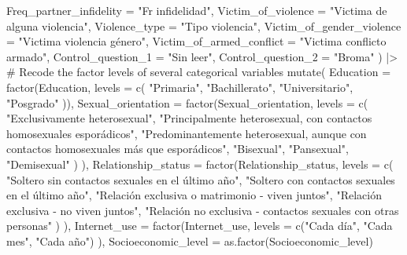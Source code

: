 \documentclass[
  bookmarksnumbered]{article}
\newenvironment{Shaded}{\begin{snugshade}}{\end{snugshade}}
\newcommand{\AttributeTok}[1]{\textcolor[rgb]{0.80,0.80,0.80}{#1}}
\newcommand{\CommentTok}[1]{\textcolor[rgb]{0.50,0.62,0.50}{#1}}
\newcommand{\FunctionTok}[1]{\textcolor[rgb]{0.94,0.94,0.56}{#1}}
\newcommand{\NormalTok}[1]{\textcolor[rgb]{0.80,0.80,0.80}{#1}}
\newcommand{\SpecialCharTok}[1]{\textcolor[rgb]{0.86,0.64,0.64}{#1}}
\newcommand{\StringTok}[1]{\textcolor[rgb]{0.80,0.58,0.58}{#1}}
\begin{document}
\begin{Shaded}
\begin{Highlighting}[]
    \AttributeTok{Freq\_partner\_infidelity =} \StringTok{"Fr infidelidad"}\NormalTok{,}
    \AttributeTok{Victim\_of\_violence =} \StringTok{"Victima de alguna violencia"}\NormalTok{,}
    \AttributeTok{Violence\_type =} \StringTok{"Tipo violencia"}\NormalTok{,}
    \AttributeTok{Victim\_of\_gender\_violence =} \StringTok{"Victima violencia género"}\NormalTok{,}
    \AttributeTok{Victim\_of\_armed\_conflict =} \StringTok{"Victima conflicto armado"}\NormalTok{,}
    \AttributeTok{Control\_question\_1 =} \StringTok{"Sin leer"}\NormalTok{,}
    \AttributeTok{Control\_question\_2 =} \StringTok{"Broma"}
\NormalTok{  ) }\SpecialCharTok{|\textgreater{}}
  \CommentTok{\# Recode the factor levels of several categorical variables}
  \FunctionTok{mutate}\NormalTok{(}
    \AttributeTok{Education =} \FunctionTok{factor}\NormalTok{(Education, }\AttributeTok{levels =} \FunctionTok{c}\NormalTok{(}
      \StringTok{"Primaria"}\NormalTok{,}
      \StringTok{"Bachillerato"}\NormalTok{,}
      \StringTok{"Universitario"}\NormalTok{,}
      \StringTok{"Posgrado"}
\NormalTok{    )),}
    \AttributeTok{Sexual\_orientation =} \FunctionTok{factor}\NormalTok{(Sexual\_orientation,}
      \AttributeTok{levels =} \FunctionTok{c}\NormalTok{(}
        \StringTok{"Exclusivamente heterosexual"}\NormalTok{,}
        \StringTok{"Principalmente heterosexual, con contactos homosexuales esporádicos"}\NormalTok{,}
        \StringTok{"Predominantemente heterosexual, aunque con contactos homosexuales más que esporádicos"}\NormalTok{,}
        \StringTok{"Bisexual"}\NormalTok{,}
        \StringTok{"Pansexual"}\NormalTok{,}
        \StringTok{"Demisexual"}
\NormalTok{      )}
\NormalTok{    ),}
    \AttributeTok{Relationship\_status =} \FunctionTok{factor}\NormalTok{(Relationship\_status,}
      \AttributeTok{levels =} \FunctionTok{c}\NormalTok{(}
        \StringTok{"Soltero sin contactos sexuales en el último año"}\NormalTok{,}
        \StringTok{"Soltero con contactos sexuales en el último año"}\NormalTok{,}
        \StringTok{"Relación exclusiva o matrimonio {-} viven juntos"}\NormalTok{,}
        \StringTok{"Relación exclusiva {-} no viven juntos"}\NormalTok{,}
        \StringTok{"Relación no exclusiva {-} contactos sexuales con otras personas"}
\NormalTok{      )}
\NormalTok{    ),}
    \AttributeTok{Internet\_use =} \FunctionTok{factor}\NormalTok{(Internet\_use,}
      \AttributeTok{levels =} \FunctionTok{c}\NormalTok{(}\StringTok{"Cada día"}\NormalTok{, }\StringTok{"Cada mes"}\NormalTok{, }\StringTok{"Cada año"}\NormalTok{)}
\NormalTok{    ),}
    \AttributeTok{Socioeconomic\_level =} \FunctionTok{as.factor}\NormalTok{(Socioeconomic\_level)}

\end{Highlighting}
\end{Shaded}
\end{document}
